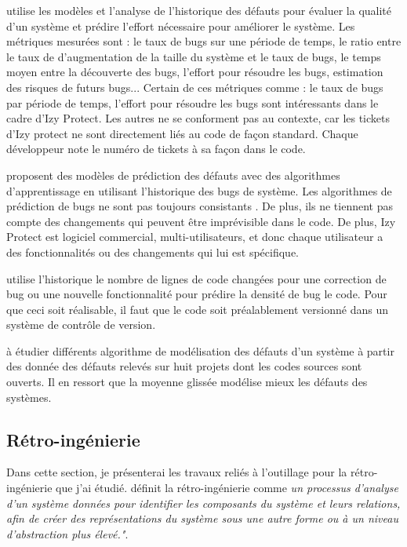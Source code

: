 \documentclass[a4paper]{article}
\begin{document}
\citet{port17} utilise les modèles et l'analyse de l'historique des défauts pour évaluer la qualité d'un système et prédire l'effort nécessaire pour améliorer le système. Les métriques mesurées sont : le taux de bugs sur une période de temps, le ratio entre le taux de d'augmentation de la taille du système et le taux de bugs, le temps moyen entre la découverte des bugs, l'effort pour résoudre les bugs, estimation des risques de futurs bugs...
Certain de ces métriques comme : le taux de bugs par période de temps, l'effort pour résoudre les bugs sont intéressants dans le cadre d'Izy Protect. 
Les autres ne se conforment pas au contexte, car les tickets d'Izy protect ne sont directement liés au code de façon standard.
Chaque développeur note le numéro de tickets à sa façon dans le code. 


\citet{kim07,Bibi06} proposent des modèles de prédiction des défauts avec des algorithmes d'apprentissage en utilisant l'historique des bugs de système. 
Les algorithmes de prédiction de bugs ne sont pas toujours consistants \cite{bang19}. De plus, ils ne tiennent pas compte des changements qui peuvent être imprévisible dans le code. De plus, Izy Protect est logiciel commercial, multi-utilisateurs, et donc chaque utilisateur a des fonctionnalités ou des changements qui lui est spécifique. 

\citet{naga05} utilise l'historique le nombre de lignes de code changées pour une correction de  bug  ou une nouvelle fonctionnalité pour prédire la densité de bug le code. Pour que ceci soit réalisable, il faut que le code soit préalablement versionné dans un système de contrôle de version.

\citet{Raja09} à étudier différents algorithme de modélisation des défauts d'un système à partir des donnée des défauts relevés sur huit projets dont les codes sources sont ouverts. Il en ressort que la moyenne glissée modélise mieux les défauts des systèmes.

\subsection{Rétro-ingénierie}
\label{sec:retroingenierie}
Dans cette section, je présenterai les travaux reliés à l'outillage pour la rétro-ingénierie que j'ai étudié.
\citet{Chik90a} définit la rétro-ingénierie comme \textit{un processus d'analyse d'un système données pour identifier les composants du système et leurs relations, afin de créer des représentations du système sous une autre forme ou à un niveau d'abstraction plus élevé."}.
\end{document}
